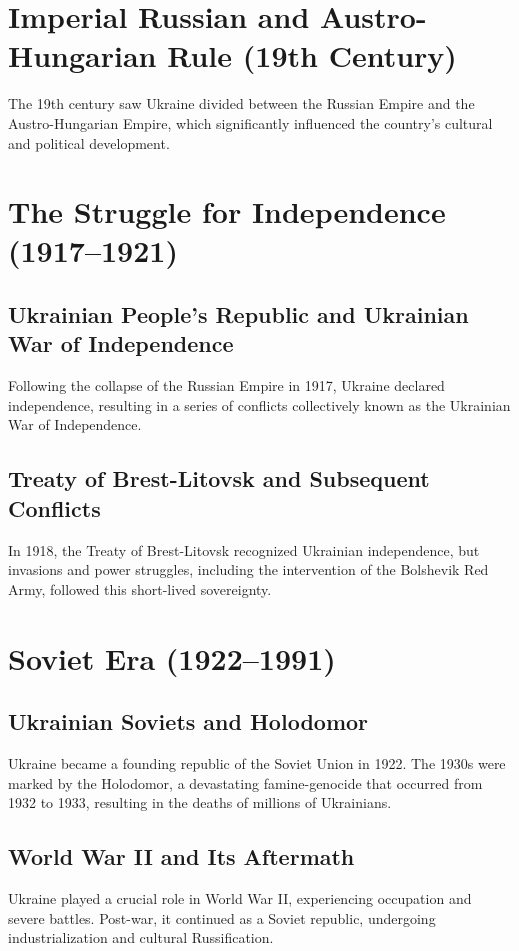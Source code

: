 \documentclass[a4paper,12pt]{book}
\begin{document}
\section{Imperial Russian and Austro-Hungarian Rule (19th Century)}
\label{sec:imperial-russian-austro-hungarian-rule}
The 19th century saw Ukraine divided between the Russian Empire and the Austro-Hungarian Empire, which significantly influenced the country's cultural and political development.

\section{The Struggle for Independence (1917–1921)}
\label{sec:struggle-for-independence}
\subsection{Ukrainian People's Republic and Ukrainian War of Independence}
Following the collapse of the Russian Empire in 1917, Ukraine declared independence, resulting in a series of conflicts collectively known as the Ukrainian War of Independence.

\subsection{Treaty of Brest-Litovsk and Subsequent Conflicts}
In 1918, the Treaty of Brest-Litovsk recognized Ukrainian independence, but invasions and power struggles, including the intervention of the Bolshevik Red Army, followed this short-lived sovereignty.

\section{Soviet Era (1922–1991)}
\label{sec:soviet-era}
\subsection{Ukrainian Soviets and Holodomor}
Ukraine became a founding republic of the Soviet Union in 1922. The 1930s were marked by the Holodomor, a devastating famine-genocide that occurred from 1932 to 1933, resulting in the deaths of millions of Ukrainians.

\subsection{World War II and Its Aftermath}
Ukraine played a crucial role in World War II, experiencing occupation and severe battles. Post-war, it continued as a Soviet republic, undergoing industrialization and cultural Russification.
\end{document}
